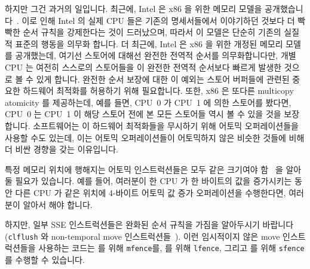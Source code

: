 하지만 그건 과거의 일입니다.
최근에, Intel 은 x86 을 위한 메모리 모델을
공개했습니다~\cite{Intelx86MemoryOrdering2007}.
이로 인해 Intel 의 실제 CPU 들은 기존의 명세서들에서 이야기하던 것보다 더
빡빡한 순서 규칙을 강제한다는 것이 드러났으며, 따라서 이 모델은 단순히 기존의
실질적 표준의 행동을 의무화 합니다.
더 최근에, Intel 은 x86 을 위한 개정된 메모리 모델~\cite[Section
8.2]{Intel64IA32v3A2011} 를 공개했는데, 여기선 스토어에 대해선 완전한 전역적
순서를 의무화합니다만, 개별 CPU 는 여전히 스스로의 스토어들을 이 완전한 전역적
순서보다 빠르게 발생한 것으로 볼 수 있게 합니다.
완전한 순서 보장에 대한 이 예외는 스토어 버퍼들에 관련된 중요한 하드웨어
최적화를 허용하기 위해 필요합니다.
또한, x86 은 또다른 multicopy atomicity 를 제공하는데, 예를 들면, CPU~0 가
CPU~1 에 의한 스토어를 봤다면, CPU~0 는 CPU~1 이 해당 스토어 전에 본 모든
스토어들 역시 볼 수 있을 것을 보장합니다.
소프트웨어는 이 하드웨어 최적화들을 무시하기 위해 어토믹 오퍼레이션들을 사용할
수도 있는데, 이는 어토믹 오퍼레이션들이 어토믹하지 않은 비슷한 것들에 비해 더
비싼 경향을 갖는 이유입니다.

특정 메모리 위치에 행해지는 어토믹 인스트럭션들은 모두 같은 크기여야
함~\cite[Section 8.1.2.2]{Intel64IA32v3A2011} 을 알아둘 필요가 있습니다.
예를 들어, 여러분이 한 CPU 가 한 바이트의 값을 증가시키는 동안 다른 CPU 가 같은
위치에 4-바이트 어토믹 값 증가 오퍼레이션을 수행한다면, 여러분이 알아서 해야
합니다.

하지만, 일부 SSE 인스트럭션들은 완화된 순서 규칙을 가짐을 알아두시기 바랍니다
({\tt clflush} 와 non-temporal move 인스트럭션들~\cite{IntelXeonV2b-96a}).
이런 임시적이지 않은 move 인스트럭션들을 사용하는 코드는  를 위해
{\tt mfence}를,  를 위해 {\tt lfence}, 그리고  를
위해 {\tt sfence} 를 수행할 수 있습니다.
\iffalse

